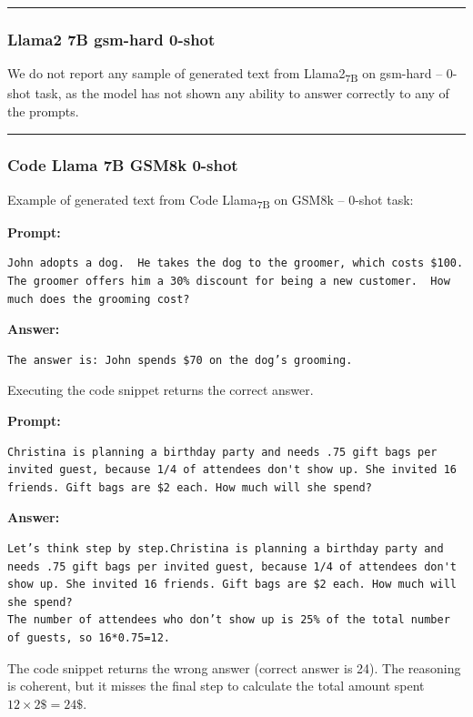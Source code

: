 \noindent\rule{\textwidth}{0.4pt}

\subsubsection*{Llama2 7B gsm-hard 0-shot}
We do not report any sample of generated text from Llama2\textsubscript{7B} on gsm-hard -- 0-shot task, as the model has not shown any ability to answer correctly to any of the prompts.

\noindent\rule{\textwidth}{0.4pt}

\subsubsection*{Code Llama 7B GSM8k 0-shot}
\noindent Example of generated text from Code Llama\textsubscript{7B} on GSM8k -- 0-shot task:
\begin{displayquote}
	\textbf{Prompt:}
	\begin{Verbatim}[fontsize=\small,breaklines]
John adopts a dog.  He takes the dog to the groomer, which costs $100.  The groomer offers him a 30% discount for being a new customer.  How much does the grooming cost?
	\end{Verbatim}
	\textbf{Answer:}
	\begin{Verbatim}[fontsize=\small,breaklines]
The answer is: John spends $70 on the dog’s grooming.
	\end{Verbatim}
\end{displayquote}
Executing the code snippet returns the correct answer.
\begin{displayquote}
	\textbf{Prompt:}
	\begin{Verbatim}[fontsize=\small,breaklines]
Christina is planning a birthday party and needs .75 gift bags per invited guest, because 1/4 of attendees don't show up. She invited 16 friends. Gift bags are $2 each. How much will she spend?
	\end{Verbatim}
	\textbf{Answer:}
	\begin{Verbatim}[fontsize=\small,breaklines]
Let’s think step by step.Christina is planning a birthday party and needs .75 gift bags per invited guest, because 1/4 of attendees don't show up. She invited 16 friends. Gift bags are $2 each. How much will she spend?
The number of attendees who don’t show up is 25% of the total number of guests, so 16*0.75=12.
	\end{Verbatim}
\end{displayquote}
The code snippet returns the wrong answer (correct answer is 24).
The reasoning is coherent, but it misses the final step to calculate the total amount spent $12 \times 2\$ = 24\$$.

